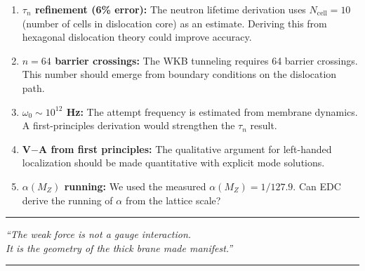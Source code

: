\begin{enumerate}
  \item \textbf{$\tau_n$ refinement (6\% error):} The neutron lifetime derivation uses
        $N_{\text{cell}} = 10$ (number of cells in dislocation core) as an estimate.
        Deriving this from hexagonal dislocation theory could improve accuracy.

  \item \textbf{$n = 64$ barrier crossings:} The WKB tunneling requires 64 barrier crossings.
        This number should emerge from boundary conditions on the dislocation path.

  \item \textbf{$\omega_0 \sim 10^{12}$ Hz:} The attempt frequency is estimated from
        membrane dynamics. A first-principles derivation would strengthen the $\tau_n$ result.

  \item \textbf{V$-$A from first principles:} The qualitative argument for left-handed
        localization should be made quantitative with explicit mode solutions.

  \item \textbf{$\alpha(M_Z)$ running:} We used the measured $\alpha(M_Z) = 1/127.9$.
        Can EDC derive the running of $\alpha$ from the lattice scale?
\end{enumerate}

\vspace{1cm}
\begin{center}
\rule{0.5\textwidth}{0.4pt}

\textit{``The weak force is not a gauge interaction.}\\
\textit{It is the geometry of the thick brane made manifest.''}

\rule{0.5\textwidth}{0.4pt}
\end{center}
